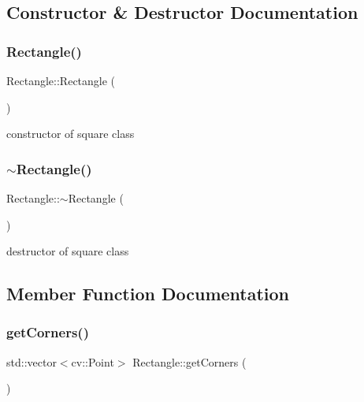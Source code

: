 \subsection{Constructor \& Destructor Documentation}
\mbox{\label{class_rectangle_a8a933e0ebd9e80ce91e61ffe87fd577e}} 
\subsubsection{\texorpdfstring{Rectangle()}{Rectangle()}}
{\footnotesize\ttfamily Rectangle\+::\+Rectangle (\begin{DoxyParamCaption}{ }\end{DoxyParamCaption})}

constructor of square class \mbox{\label{class_rectangle_a494c076b13aadf26efdce07d23c61ddd}} 
\subsubsection{\texorpdfstring{$\sim$\+Rectangle()}{~Rectangle()}}
{\footnotesize\ttfamily Rectangle\+::$\sim$\+Rectangle (\begin{DoxyParamCaption}{ }\end{DoxyParamCaption})}

destructor of square class 

\subsection{Member Function Documentation}
\mbox{\label{class_rectangle_ae250a28affce22b4a363d1a0213df9fa}} 
\subsubsection{\texorpdfstring{get\+Corners()}{getCorners()}}
{\footnotesize\ttfamily std\+::vector$<$cv\+::\+Point$>$ Rectangle\+::get\+Corners (\begin{DoxyParamCaption}{ }\end{DoxyParamCaption})}

